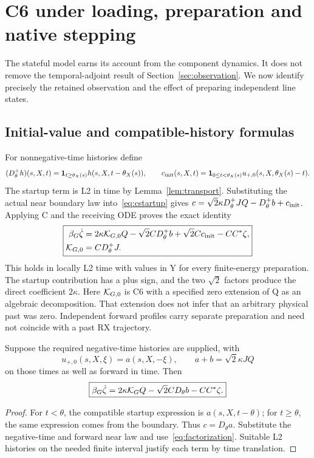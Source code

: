 \section{C6 under loading, preparation and native stepping}\label{sec:preparation}
The stateful model earns its account from the component dynamics. It does not remove the temporal-adjoint result of Section~\ref{sec:observation}. We now identify precisely the retained observation and the effect of preparing independent line states.

\subsection{Initial-value and compatible-history formulas}
For nonnegative-time histories define
\begin{equation}\label{eq:delayplus}
(D_\theta^+h)(s,X,t)=\mathbf1_{t\ge\theta_X(s)}h(s,X,t-\theta_X(s)),\qquad
c_{\rm init}(s,X,t)=\mathbf1_{0\le t<\theta_X(s)}u_{+,0}(s,X,\theta_X(s)-t).
\end{equation}
The startup term is L2 in time by Lemma~\ref{lem:transport}. Substituting the actual near boundary law into~\eqref{eq:cstartup} gives
$c=\sqrt2\kappa D_\theta^+JQ-D_\theta^+b+c_{\rm init}$.
Applying C and the receiving ODE proves the exact identity
\begin{equation}\label{eq:loadedC6}
\boxed{\begin{aligned}
\beta_G\dot\zeta&=2\kappa\mathcal K_{G,0} Q-\sqrt2CD_\theta^+b
+\sqrt2C c_{\rm init}-CC^*\zeta,\\
\mathcal K_{G,0}&=CD_\theta^+J.
\end{aligned}}
\end{equation}
This holds in locally L2 time with values in Y for every finite-energy preparation. The startup contribution has a plus sign, and the two $\sqrt2$ factors produce the direct coefficient $2\kappa$. Here $\mathcal K_{G,0}$ is C6 with a specified zero extension of Q as an algebraic decomposition. That extension does not infer that an arbitrary physical past was zero. Independent forward profiles carry separate preparation and need not coincide with a past RX trajectory.

\begin{proposition}\label{prop:completehistory}
Suppose the required negative-time histories are supplied, with
\begin{equation}\label{eq:historycompatibility}
u_{+,0}(s,X,\xi)=a(s,X,-\xi),\qquad
a+b=\sqrt2\kappa JQ
\end{equation}
on those times as well as forward in time. Then
\begin{equation}\label{eq:completeC6}
\boxed{\beta_G\dot\zeta=2\kappa\mathcal K_G Q-\sqrt2CD_\theta b-CC^*\zeta.}
\end{equation}
\end{proposition}
\begin{proof}
For $t<\theta$, the compatible startup expression is $a(s,X,t-\theta)$; for $t\ge\theta$, the same expression comes from the boundary. Thus $c=D_\theta a$. Substitute the negative-time and forward near law and use~\eqref{eq:factorization}. Suitable L2 histories on the needed finite interval justify each term by time translation.
\end{proof}

